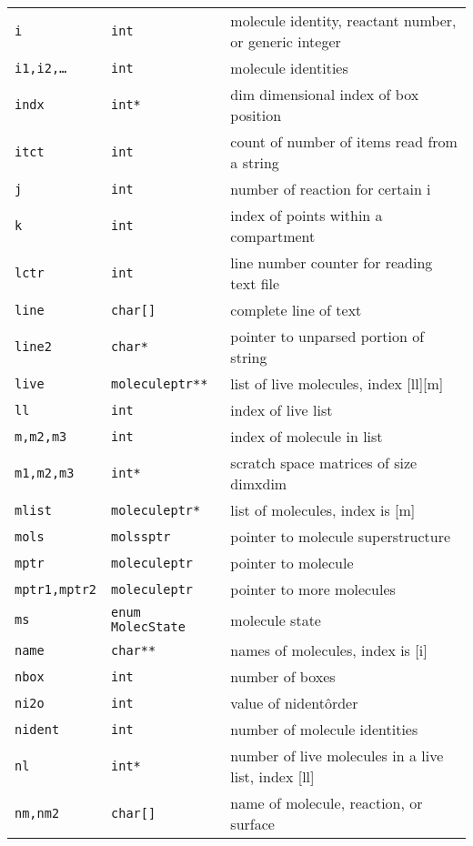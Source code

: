 \documentclass {book}
\begin{document}
\begin{longtable}[c]{lll}
\texttt{i} & \texttt{int} & molecule identity, reactant number, or generic integer\\
\texttt{i1,i2,\ldots} & \texttt{int} & molecule identities\\
\texttt{indx} & \texttt{int*} & dim dimensional index of box position\\
\texttt{itct} & \texttt{int} & count of number of items read from a string\\
\texttt{j} & \texttt{int} & number of reaction for certain i\\
\texttt{k} & \texttt{int} & index of points within a compartment\\
\texttt{lctr} & \texttt{int} & line number counter for reading text file\\
\texttt{line} & \texttt{char[]} & complete line of text\\
\texttt{line2} & \texttt{char*} & pointer to unparsed portion of string\\
\texttt{live} & \texttt{moleculeptr**} & list of live molecules, index [ll][m]\\
\texttt{ll} & \texttt{int} & index of live list\\
\texttt{m,m2,m3} & \texttt{int} & index of molecule in list\\
\texttt{m1,m2,m3} & \texttt{int*} & scratch space matrices of size dimxdim\\
\texttt{mlist} & \texttt{moleculeptr*} & list of molecules, index is [m]\\
\texttt{mols} & \texttt{molssptr} & pointer to molecule superstructure\\
\texttt{mptr} & \texttt{moleculeptr} & pointer to molecule\\
\texttt{mptr1,mptr2} & \texttt{moleculeptr} & pointer to more molecules\\
\texttt{ms} & \texttt{enum MolecState} & molecule state\\
\texttt{name} & \texttt{char**} & names of molecules, index is [i]\\
\texttt{nbox} & \texttt{int} & number of boxes\\
\texttt{ni2o} & \texttt{int} & value of nident\^order\\
\texttt{nident} & \texttt{int} & number of molecule identities\\
\texttt{nl} & \texttt{int*} & number of live molecules in a live list, index [ll]\\
\texttt{nm,nm2} & \texttt{char[]} & name of molecule, reaction, or surface\\

\end{longtable}
\end{document}
